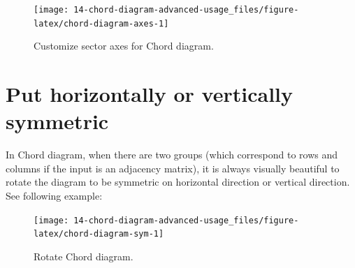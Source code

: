 \documentclass[]{book}
\newenvironment{Shaded}{\begin{snugshade}}{\end{snugshade}}
\newcommand{\KeywordTok}[1]{\textcolor[rgb]{0.13,0.29,0.53}{\textbf{#1}}}
\newcommand{\DataTypeTok}[1]{\textcolor[rgb]{0.13,0.29,0.53}{#1}}
\newcommand{\DecValTok}[1]{\textcolor[rgb]{0.00,0.00,0.81}{#1}}
\newcommand{\StringTok}[1]{\textcolor[rgb]{0.31,0.60,0.02}{#1}}
\newcommand{\NormalTok}[1]{#1}
\begin{document}
\begin{figure}

{\centering \texttt{[image: 14-chord-diagram-advanced-usage\_files/figure-latex/chord-diagram-axes-1]} 

}

\caption{Customize sector axes for Chord diagram.}\label{fig:chord-diagram-axes}
\end{figure}

\section{Put horizontally or vertically
symmetric}\label{put-horizontally-or-vertically-symmetric}

In Chord diagram, when there are two groups (which correspond to rows
and columns if the input is an adjacency matrix), it is always visually
beautiful to rotate the diagram to be symmetric on horizontal direction
or vertical direction. See following example:

\begin{Shaded}
\end{Shaded}

\begin{figure}

{\centering \texttt{[image: 14-chord-diagram-advanced-usage\_files/figure-latex/chord-diagram-sym-1]} 

}

\caption{Rotate Chord diagram.}\label{fig:chord-diagram-sym}
\end{figure}
\end{document}
